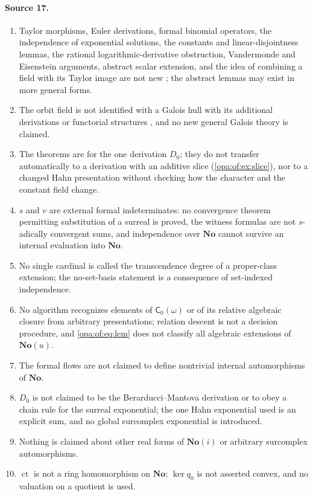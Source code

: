 \documentclass[11pt,oneside]{article}
\numberwithin{equation}{section}
\theoremstyle{definition}
\theoremstyle{remark}
\newcommand{\No}{\mathbf{No}}
\newcommand{\SC}{\mathbf{No}(i)}
\newcommand{\ct}{\operatorname{ct}}
\begin{document}
\paragraph{Source 17.}
\begin{enumerate}[itemsep=1pt]
\item Taylor morphisms, Euler derivations, formal binomial operators, the independence of exponential solutions, the constants and
linear-disjointness lemmas, the rational logarithmic-derivative obstruction, Vandermonde and Eisenstein arguments, abstract scalar
extension, and the idea of combining a field with its Taylor image are not new \cite{Ng,Kolchin,BKKPS,KKS}; the abstract lemmas may
exist in more general forms.
\item The orbit field is not identified with a Galois hull with its additional derivations or functorial structures \cite{Heiderich},
and no new general Galois theory is claimed.
\item The theorems are for the one derivation $D_0$; they do not transfer automatically to a derivation with an additive slice
(\cref{opa:of:ex:slice}), nor to a changed Hahn presentation without checking how the character and the constant field change.
\item $s$ and $v$ are external formal indeterminates: no convergence theorem permitting substitution of a surreal is proved, the witness
formulas are not $s$-adically convergent sums, and independence over $\No$ cannot survive an internal evaluation into $\No$.
\item No single cardinal is called the transcendence degree of a proper-class extension; the no-set-basis statement is a consequence of
set-indexed independence.
\item No algorithm recognizes elements of $\mathsf C_0(\omega)$ or of its relative algebraic closure from arbitrary presentations;
relation descent is not a decision procedure, and \eqref{opa:of:eq:lcm} does not classify all algebraic extensions of $\No(u)$.
\item The formal flows are not claimed to define nontrivial internal automorphisms of $\No$.
\item $D_0$ is not claimed to be the Berarducci--Mantova derivation or to obey a chain rule for the surreal exponential; the one Hahn
exponential used is an explicit sum, and no global surcomplex exponential is introduced.
\item Nothing is claimed about other real forms of $\SC$ or arbitrary surcomplex automorphisms.
\item $\ct$ is not a ring homomorphism on $\No$; $\ker q_0$ is not asserted convex, and no valuation on a quotient is used.

\end{enumerate}
\end{document}
